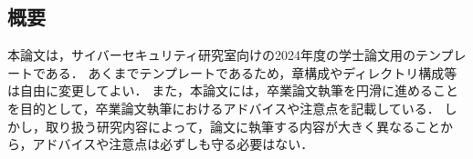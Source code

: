 \begin{center}
    \subsection*{概要}
\end{center}

本論文は，サイバーセキュリティ研究室向けの2024年度の学士論文用のテンプレートである．
あくまでテンプレートであるため，章構成やディレクトリ構成等は自由に変更してよい．
また，本論文には，卒業論文執筆を円滑に進めることを目的として，卒業論文執筆におけるアドバイスや注意点を記載している．
しかし，取り扱う研究内容によって，論文に執筆する内容が大きく異なることから，アドバイスや注意点は必ずしも守る必要はない．

